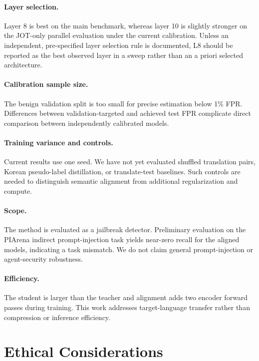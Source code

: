 \documentclass[10pt,twocolumn]{article}
\begin{document}
\paragraph{Layer selection.}
Layer 8 is best on the main benchmark, whereas layer 10 is slightly stronger on
the JOT-only parallel evaluation under the current calibration. Unless an
independent, pre-specified layer selection rule is documented, L8 should be
reported as the best observed layer in a sweep rather than an a priori selected
architecture.

\paragraph{Calibration sample size.}
The benign validation split is too small for precise estimation below 1\% FPR.
Differences between validation-targeted and achieved test FPR complicate direct
comparison between independently calibrated models.

\paragraph{Training variance and controls.}
Current results use one seed. We have not yet evaluated shuffled translation
pairs, Korean pseudo-label distillation, or translate-test baselines. Such
controls are needed to distinguish semantic alignment from additional
regularization and compute.

\paragraph{Scope.}
The method is evaluated as a jailbreak detector. Preliminary evaluation on the
PIArena indirect prompt-injection task yields near-zero recall for the aligned
models, indicating a task mismatch. We do not claim general prompt-injection or
agent-security robustness.

\paragraph{Efficiency.}
The student is larger than the teacher and alignment adds two encoder forward
passes during training. This work addresses target-language transfer rather
than compression or inference efficiency.

\section{Ethical Considerations}
\end{document}
